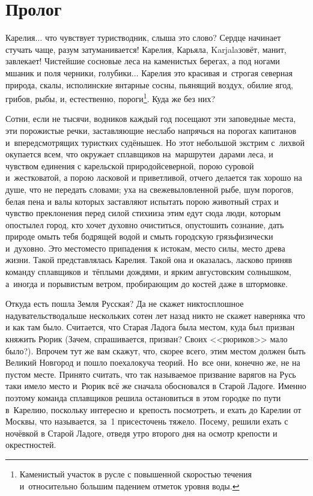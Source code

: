 {

{
\cleardoublepage
{}


\section*{Пролог}

\fancyhead[LE]{\fancyplain{}{}}
\fancyhead[RO]{\fancyplain{}{}}

Карелия$\ldots$ что чувствует турист\sdash водник, слыша это слово? Сердце начинает стучать чаще, разум затуманивается! Карелия, Карьяла, Karjala\mdash зовёт, манит, завлекает! Чистейшие сосновые леса на каменистых берегах, а под ногами мшаник и поля черники, голубики$\ldots$ Карелия это красивая и~строгая северная природа, скалы, исполинские янтарные сосны, пьянящий воздух, обилие ягод, грибов, рыбы, и, естественно, пороги\footnote{Каменистый участок в русле с повышенной скоростью течения и~относительно большим падением отметок уровня воды.}. Куда же без них? 

Сотни, если не тысячи, водников каждый год посещают эти заповедные места, эти порожистые речки, заставляющие неслабо напрячься на порогах капитанов и~впередсмотрящих туристких судёнышек. Но этот небольшой экстрим с~лихвой окупается всем, что окружает сплавщиков на~маршруте\mdash и~дарами леса, и чувством единения с карельской природой\mdash северной, порою суровой и~жестковатой, а порою ласковой и приветливой, отчего делается так хорошо на душе, что не передать словами; уха на свежевыловленной рыбе, шум порогов, белая пена и валы которых заставляют испытать порою животный страх и чувство преклонения перед силой стихии\mdash за этим едут сюда люди, которым опостылел город, кто хочет духовно очиститься, опустошить сознание, дать природе омыть тебя бодрящей водой и смыть городскую грязь\mdash физически и~духовно. Это место\mdash место припадения к истокам, место силы, место древа жизни. Такой представлялась Карелия. Такой она и оказалась, ласково приняв команду сплавщиков и~тёплыми дождями, и ярким августовским солнышком, а~иногда и порывистым ветром, пробирающим до костей даже в штормовке.  

Откуда есть пошла Земля Русская? Да не скажет никто\mdash сплошное надувательство\mdash дальше нескольких сотен лет назад никто не скажет наверняка что и как там было. Считается, что Старая Ладога была местом, куда был призван княжить Рюрик (Зачем, спрашивается, призван? Своих <<рюриков>> мало было?). Впрочем тут же вам скажут, что, скорее всего, этим местом должен быть Великий Новгород и пошло поехало\mdash куча теорий. Но~все они, конечно же, не на пустом месте. Принято считать, что так называемое призвание варягов на Русь таки имело место и~Рюрик всё же сначала обосновался в Старой Ладоге. Именно поэтому команда сплавщиков решила остановиться в этом городке по пути в~Карелию, поскольку интересно и~крепость посмотреть, и ехать до Карелии от Москвы, что называется, за~1 присест\mdash очень тяжело. Посему, решили ехать с ночёвкой в Старой Ладоге, отведя утро второго дня на осмотр крепости и окрестностей. 

}}

